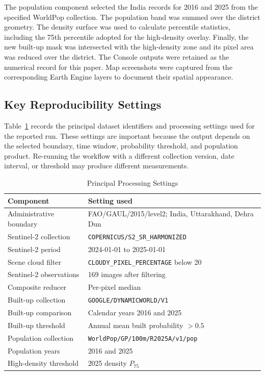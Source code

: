 \documentclass[conference]{IEEEtran}
\begin{document}
The population component selected the India records for 2016 and 2025 from the specified WorldPop collection. The population band was summed over the district geometry. The density surface was used to calculate percentile statistics, including the 75th percentile adopted for the high-density overlay. Finally, the new built-up mask was intersected with the high-density zone and its pixel area was reduced over the district. The Console outputs were retained as the numerical record for this paper. Map screenshots were captured from the corresponding Earth Engine layers to document their spatial appearance.

\subsection{Key Reproducibility Settings}
Table~\ref{tab:settings} records the principal dataset identifiers and processing settings used for the reported run. These settings are important because the output depends on the selected boundary, time window, probability threshold, and population product. Re-running the workflow with a different collection version, date interval, or threshold may produce different measurements.

\begin{table}[!t]
\caption{Principal Processing Settings}
\label{tab:settings}
\centering
\footnotesize
\begin{tabular}{p{}p{}}
\toprule
\textbf{Component}&\textbf{Setting used}\\
\midrule
Administrative boundary&FAO/GAUL/2015/level2; India, Uttarakhand, Dehra Dun\\
Sentinel-2 collection&\texttt{COPERNICUS/S2\_SR\_HARMONIZED}\\
Sentinel-2 period&2024-01-01 to 2025-01-01\\
Scene cloud filter&\texttt{CLOUDY\_PIXEL\_PERCENTAGE} below 20\\
Sentinel-2 observations&169 images after filtering\\
Composite reducer&Per-pixel median\\
Built-up collection&\texttt{GOOGLE/DYNAMICWORLD/V1}\\
Built-up comparison&Calendar years 2016 and 2025\\
Built-up threshold&Annual mean built probability $>0.5$\\
Population collection&\texttt{WorldPop/GP/100m/R2025A/v1/pop}\\
Population years&2016 and 2025\\
High-density threshold&2025 density $P_{75}$\\
\bottomrule
\end{tabular}
\end{table}
\end{document}
